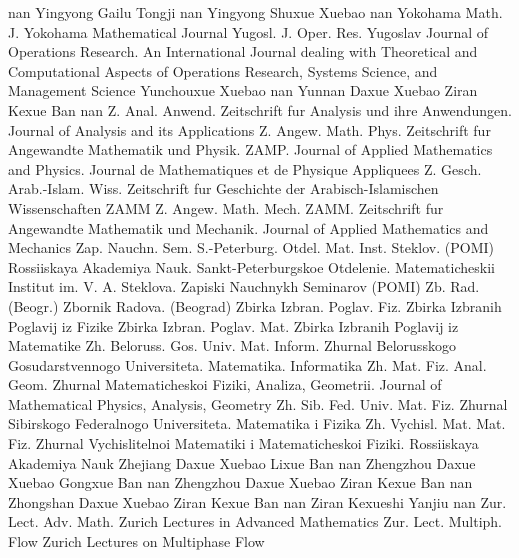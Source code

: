 {nan}
{Yingyong Gailu Tongji}
{nan}
{Yingyong Shuxue Xuebao}
{nan}
{Yokohama Math. J.}
{Yokohama Mathematical Journal}
{Yugosl. J. Oper. Res.}
{Yugoslav Journal of Operations Research. An International Journal dealing with Theoretical and Computational Aspects of Operations Research, Systems Science, and Management Science}
{Yunchouxue Xuebao}
{nan}
{Yunnan Daxue Xuebao Ziran Kexue Ban}
{nan}
{Z. Anal. Anwend.}
{Zeitschrift fur Analysis und ihre Anwendungen. Journal of Analysis and its Applications}
{Z. Angew. Math. Phys.}
{Zeitschrift fur Angewandte Mathematik und Physik. ZAMP. Journal of Applied Mathematics and Physics. Journal de Mathematiques et de Physique Appliquees}
{Z. Gesch. Arab.-Islam. Wiss.}
{Zeitschrift fur Geschichte der Arabisch-Islamischen Wissenschaften}
{ZAMM Z. Angew. Math. Mech.}
{ZAMM. Zeitschrift fur Angewandte Mathematik und Mechanik. Journal of Applied Mathematics and Mechanics}
{Zap. Nauchn. Sem. S.-Peterburg. Otdel. Mat. Inst. Steklov. (POMI)}
{Rossiiskaya Akademiya Nauk. Sankt-Peterburgskoe Otdelenie. Matematicheskii Institut im. V. A. Steklova. Zapiski Nauchnykh Seminarov (POMI)}
{Zb. Rad. (Beogr.)}
{Zbornik Radova. (Beograd)}
{Zbirka Izbran. Poglav. Fiz.}
{Zbirka Izbranih Poglavij iz Fizike}
{Zbirka Izbran. Poglav. Mat.}
{Zbirka Izbranih Poglavij iz Matematike}
{Zh. Beloruss. Gos. Univ. Mat. Inform.}
{Zhurnal Belorusskogo Gosudarstvennogo Universiteta. Matematika. Informatika}
{Zh. Mat. Fiz. Anal. Geom.}
{Zhurnal Matematicheskoi Fiziki, Analiza, Geometrii. Journal of Mathematical Physics, Analysis, Geometry}
{Zh. Sib. Fed. Univ. Mat. Fiz.}
{Zhurnal Sibirskogo Federalnogo Universiteta. Matematika i Fizika}
{Zh. Vychisl. Mat. Mat. Fiz.}
{Zhurnal Vychislitelnoi Matematiki i Matematicheskoi Fiziki. Rossiiskaya Akademiya Nauk}
{Zhejiang Daxue Xuebao Lixue Ban}
{nan}
{Zhengzhou Daxue Xuebao Gongxue Ban}
{nan}
{Zhengzhou Daxue Xuebao Ziran Kexue Ban}
{nan}
{Zhongshan Daxue Xuebao Ziran Kexue Ban}
{nan}
{Ziran Kexueshi Yanjiu}
{nan}
{Zur. Lect. Adv. Math.}
{Zurich Lectures in Advanced Mathematics}
{Zur. Lect. Multiph. Flow}
{Zurich Lectures on Multiphase Flow}
